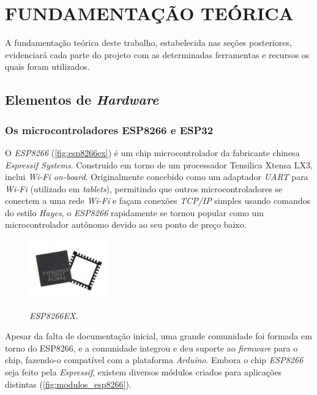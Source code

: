 
\chapter{FUNDAMENTAÇÃO TEÓRICA}
\label{chap:fundamentacao-teorica}

A fundamentação teórica deste trabalho, estabelecida nas seções posteriores, evidenciará cada parte do projeto com as determinadas ferramentas e recursos os quais foram utilizados. 


\section{Elementos de \textit{Hardware}}
\subsection{Os microcontroladores ESP8266 e ESP32}

O \textit{ESP8266} (\autoref{fig:esp8266ex}) é um chip microcontrolador da fabricante chinesa \textit{Espressif Systems}. Construído em torno de um processador Tensilica Xtensa LX3, inclui \textit{Wi-Fi on-board}. Originalmente concebido como um adaptador \textit{UART} para \textit{Wi-Fi} (utilizado em \textit{tablets}), permitindo que outros microcontroladores se conectem a uma rede \textit{Wi-Fi} e façam conexões \textit{TCP/IP} simples usando comandos do estilo \textit{Hayes}, o \textit{ESP8266} rapidamente se tornou popular como um microcontrolador autônomo devido ao seu ponto de preço baixo.

\begin{figure}[H]
	\centering
	\caption{\textit{ESP8266EX}.}
	\includegraphics[width=0.3\textwidth]{figuras/esp8266ex.jpg}
	\label{fig:esp8266ex}
\end{figure} 

Apesar da falta de documentação inicial, uma grande comunidade foi formada em
torno do ESP8266, e a comunidade integrou e deu suporte ao \textit{firmware} para o chip, fazendo-o compatível com a plataforma \textit{Arduino}.
Embora o chip \textit{ESP8266} seja feito pela \textit{Espressif}, existem diversos módulos criados para aplicações distintas (\autoref{fig:modulos_esp8266}).

